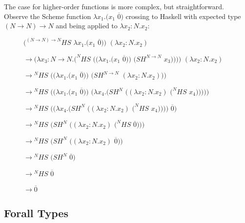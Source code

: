The case for higher-order functions is more complex, but straightforward.  Observe the Scheme function $\lambda x_{1}.(x_{1}$ $\overline{0})$ crossing to Haskell with expected type $(N\rightarrow N)\rightarrow N$ and being applied to $\lambda x_{2}:N.x_{2}$:

\begin{figure}[h]
$(^{(N\rightarrow N)\rightarrow N}HS$ $\lambda x_{1}.(x_{1}$ $\overline{0}))$ $(\lambda x_{2}:N.x_{2})$

\vspace{5pt}

$\rightarrow(\lambda x_{3}:N\rightarrow N.(^{N}HS$ $((\lambda x_{1}.(x_{1}$ $\overline{0}))$ $(SH^{N\rightarrow N}$ $x_{3}))))$ $(\lambda x_{2}:N.x_{2})$

\vspace{5pt}

$\rightarrow{^{N}H}S$ $((\lambda x_{1}.(x_{1}$ $\overline{0}))$ $(SH^{N\rightarrow N}$ $(\lambda x_{2}:N.x_{2})))$

\vspace{5pt}

$\rightarrow{^{N}H}S$ $((\lambda x_{1}.(x_{1}$ $\overline{0}))$ $(\lambda x_{4}.(SH^{N}$ $((\lambda x_{2}:N.x_{2})$ $(^{N}HS$ $x_{4})))))$

\vspace{5pt}

$\rightarrow{^{N}H}S$ $((\lambda x_{4}.(SH^{N}$ $((\lambda x_{2}:N.x_{2})$ $(^{N}HS$ $x_{4}))))$ $\overline{0})$

\vspace{5pt}

$\rightarrow{^{N}H}S$ $(SH^{N}$ $((\lambda x_{2}:N.x_{2})$ $(^{N}HS$ $\overline{0})))$

\vspace{5pt}

$\rightarrow{^{N}H}S$ $(SH^{N}$ $((\lambda x_{2}:N.x_{2})$ $\overline{0}))$

\vspace{5pt}

$\rightarrow{^{N}H}S$ $(SH^{N}$ $\overline{0})$

\vspace{5pt}

$\rightarrow{^{N}H}S$ $\overline{0}$

\vspace{5pt}

$\rightarrow\overline{0}$
\end{figure}

\subsection{Forall Types}

